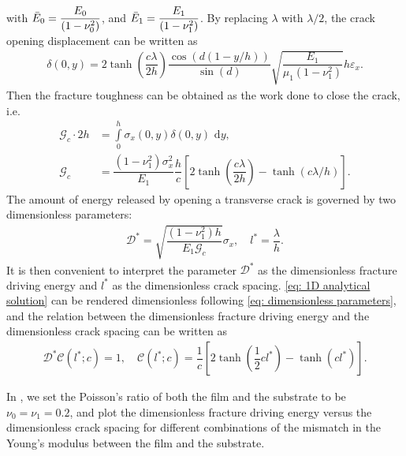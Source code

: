 with $\Bar{E}_0 = \dfrac{E_0}{(1-\nu_0^2)}$, and $\Bar{E}_1 = \dfrac{E_1}{(1-\nu_1^2)}$. By replacing $\lambda$ with $\lambda/2$, the crack opening displacement can be written as
\begin{align}
  \delta(0,y) = 2\tanh\left(\dfrac{c\lambda}{2h}\right)\dfrac{\cos(d(1-y/h))}{\sin(d)}\sqrt{\dfrac{E_1}{\mu_1(1-\nu_1^2)}}h\varepsilon_x .
\end{align}
Then the fracture toughness can be obtained as the work done to close the crack, i.e.
\begin{align}
  \mathcal{G}_c\cdot2h & = \int\limits_0^h \sigma_x(0,y)\delta(0,y)\text{ d}y,                                                                                                          \\
  \mathcal{G}_c        & = \dfrac{(1-\nu_1^2)\sigma_x^2}{E_1}\dfrac{h}{c}\left[ 2\tanh\left( \dfrac{c\lambda}{2h} \right)-\tanh(c\lambda/h) \right] .\label{eq: 1D analytical solution} 
\end{align}
The amount of energy released by opening a transverse crack is governed by two dimensionless parameters:
\begin{align}
  \mathcal{D}^* = \sqrt{\dfrac{(1-\nu_1^2)h}{E_1\mathcal{G}_c}}\sigma_x, \quad l^* = \dfrac{\lambda}{h} \label{eq: dimensionless parameters}.
\end{align}
It is then convenient to interpret the  parameter $\mathcal{D}^*$ as the dimensionless fracture driving energy and $l^*$ as the dimensionless crack spacing. \eqref{eq: 1D analytical solution} can be rendered dimensionless following \eqref{eq: dimensionless parameters}, and the relation between the dimensionless fracture driving energy and the dimensionless crack spacing can be written as
\begin{align}
  \mathcal{D}^* \mathcal{C}(l^*;c) = 1, \quad \mathcal{C}(l^*;c) = \dfrac{1}{c}\left[ 2\tanh\left( \dfrac{1}{2} c l^* \right)-\tanh(cl^*) \right].
\end{align}



In , we set the Poisson's ratio of both the film and the substrate to be $\nu_0 = \nu_1 = 0.2$, and plot the dimensionless fracture driving energy versus the dimensionless crack spacing for different combinations of the mismatch in the Young's modulus between the film and the substrate.

